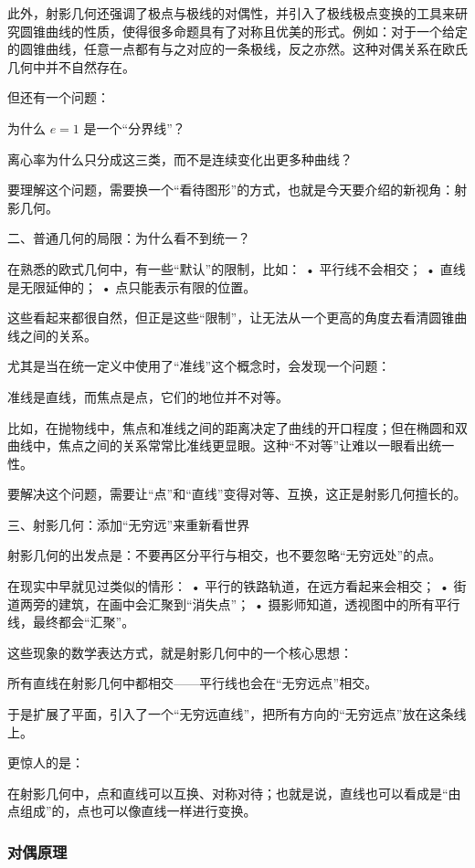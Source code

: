 此外，射影几何还强调了极点与极线的对偶性，并引入了极线极点变换的工具来研究圆锥曲线的性质，使得很多命题具有了对称且优美的形式。例如：对于一个给定的圆锥曲线，任意一点都有与之对应的一条极线，反之亦然。这种对偶关系在欧氏几何中并不自然存在。



但还有一个问题：

为什么 $e=1$ 是一个“分界线”？

离心率为什么只分成这三类，而不是连续变化出更多种曲线？

要理解这个问题，需要换一个“看待图形”的方式，也就是今天要介绍的新视角：射影几何。


二、普通几何的局限：为什么看不到统一？

在熟悉的欧式几何中，有一些“默认”的限制，比如：
	•	平行线不会相交；
	•	直线是无限延伸的；
	•	点只能表示有限的位置。

这些看起来都很自然，但正是这些“限制”，让无法从一个更高的角度去看清圆锥曲线之间的关系。

尤其是当在统一定义中使用了“准线”这个概念时，会发现一个问题：

准线是直线，而焦点是点，它们的地位并不对等。

比如，在抛物线中，焦点和准线之间的距离决定了曲线的开口程度；但在椭圆和双曲线中，焦点之间的关系常常比准线更显眼。这种“不对等”让难以一眼看出统一性。

要解决这个问题，需要让“点”和“直线”变得对等、互换，这正是射影几何擅长的。

三、射影几何：添加“无穷远”来重新看世界

射影几何的出发点是：不要再区分平行与相交，也不要忽略“无穷远处”的点。

在现实中早就见过类似的情形：
	•	平行的铁路轨道，在远方看起来会相交；
	•	街道两旁的建筑，在画中会汇聚到“消失点”；
	•	摄影师知道，透视图中的所有平行线，最终都会“汇聚”。

这些现象的数学表达方式，就是射影几何中的一个核心思想：

所有直线在射影几何中都相交——平行线也会在“无穷远点”相交。

于是扩展了平面，引入了一个“无穷远直线”，把所有方向的“无穷远点”放在这条线上。

更惊人的是：

在射影几何中，点和直线可以互换、对称对待；也就是说，直线也可以看成是“由点组成”的，点也可以像直线一样进行变换。

\subsubsection{对偶原理}

